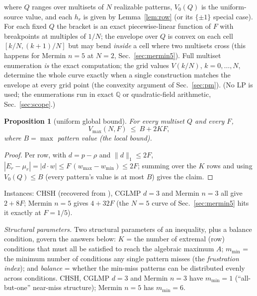 \documentclass[aps,pra,reprint,superscriptaddress,floatfix]{revtex4-2}
\newtheorem{proposition}{Proposition}
\begin{document}
where $Q$ ranges over multisets of $N$ realizable patterns,
$V_{0}(Q)$ is the uniform-source value, and each $h_{r}$ is given by
Lemma~\ref{lem:row} (or its $\{\pm1\}$ special case). For each fixed $Q$
the bracket is an exact piecewise-linear function of $F$ with breakpoints at
multiples of $1/N$; the envelope over $Q$ is convex on each cell
$[k/N,(k+1)/N]$ but may bend \emph{inside} a cell where two multisets cross
(this happens for {Mermin} $n=5$ at $N=2$, Sec.~\ref{sec:mermin5}). Full
multiset enumeration \emph{is} the exact computation; the grid values
$V(k/N)$, $k=0,\dots,N$, determine the whole curve exactly when a single
construction matches the envelope at every grid point (the convexity
argument of Sec.~\ref{sec:pm}). (No LP is used; the
enumerations run in exact $\mathbb{Q}$ or quadratic-field arithmetic,
Sec.~\ref{sec:scope}.)

\begin{proposition}[uniform global bound]
\label{prop:uniform}
For every multiset $Q$ and every $F$,
\begin{equation}
V_{\max}(N,F)\ \le\ B+2KF,
\label{eq:uniform}
\end{equation}
where $B=\max$ pattern value (the local bound).
\end{proposition}

\begin{proof}
Per row, with $d=p-\rho$ and $\|d\|_{1}\le 2F$,
$|E_{r}-\mu_{r}|=|d\cdot w|\le F\,(w_{\max}-w_{\min})\le 2F$; summing over
the $K$ rows and using $V_{0}(Q)\le B$ (every pattern's value is at most
$B$) gives the claim.
\end{proof}

Instances: {CHSH} (recovered from \cite{mainpaper2026}), {CGLMP} $d=3$ and
{Mermin} $n=3$ all give $2+8F$; {Mermin} $n=5$ gives $4+32F$ (the $N=5$
curve of Sec.~\ref{sec:mermin5} hits it exactly at $F=1/5$).

\emph{Structural parameters.} Two structural parameters of an inequality,
plus a balance condition, govern the answers below: $K$ = the number of
extremal (row) conditions that must all be satisfied to reach the
algebraic maximum $A$; $m_{\min}$ = the minimum number of conditions any
single pattern misses (the \emph{frustration index}); and \emph{balance}
= whether the min-miss patterns can be distributed evenly across
conditions. {CHSH}, {CGLMP} $d=3$ and {Mermin} $n=3$ have $m_{\min}=1$
(``all-but-one'' near-miss structure); {Mermin} $n=5$ has $m_{\min}=6$.

\end{document}
